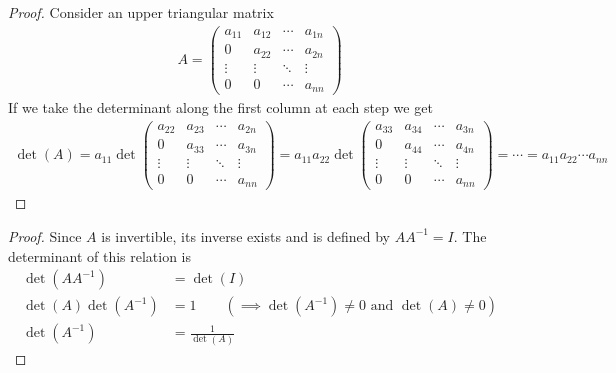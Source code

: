 \begin{proof} Consider an upper triangular matrix
\begin{align*}
A =
\begin{pmatrix}
a_{11} & a_{12} & \cdots & a_{1n} \\
0 & a_{22} & \cdots & a_{2n} \\
\vdots & \vdots & \ddots & \vdots \\
0 & 0 & \cdots & a_{nn}
\end{pmatrix}
\end{align*}
If we take the determinant along the first column at each step we get
\begin{align*}
\det(A) 
= a_{11} 
\det\begin{pmatrix}
a_{22} & a_{23} & \cdots & a_{2n} \\
0 & a_{33} & \cdots & a_{3n} \\
\vdots & \vdots & \ddots & \vdots \\
0 & 0 & \cdots & a_{nn}
\end{pmatrix} 
= a_{11}a_{22} 
\det\begin{pmatrix}
a_{33} & a_{34} & \cdots & a_{3n} \\
0 & a_{44} & \cdots & a_{4n} \\
\vdots & \vdots & \ddots & \vdots \\
0 & 0 & \cdots & a_{nn}
\end{pmatrix}
= \cdots = a_{11}a_{22} \cdots  a_{nn}
\end{align*}
\end{proof}



\begin{proof} 
Since $A$ is invertible, its inverse exists and is defined by $AA^{-1}=I$. The determinant of this relation is
\begin{align*}
\det(AA^{-1}) &= \det(I) \\
\det(A)\det(A^{-1}) &= 1 \qquad (\implies \det(A^{-1})\neq 0 \text{ and } \det(A)\neq 0)\\
\det(A^{-1}) &=\frac{1}{\det(A)}
\end{align*}
\end{proof}

